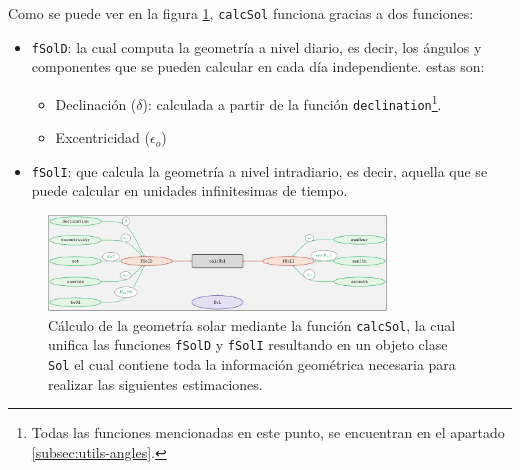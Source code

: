 Como se puede ver en la figura \ref{fig:calcSol}, \texttt{calcSol} funciona gracias a dos funciones:
\begin{itemize}
\item \texttt{fSolD}: la cual computa la geometría a nivel diario, es decir, los ángulos y componentes que se pueden calcular en cada día independiente.
estas son:
\begin{itemize}
\item Declinación (\(\delta\)): calculada a partir de la función \texttt{declination}\footnote{Todas las funciones mencionadas en este punto, se encuentran en el apartado \ref{subsec:utils-angles}.}.
\item Excentricidad (\(\epsilon_o\))
\end{itemize}
\item \texttt{fSolI}: que calcula la geometría a nivel intradiario, es decir, aquella que se puede calcular en unidades infinitesimas de tiempo.
\end{itemize}
\begin{figure}[]
\centering
\includegraphics[keepaspectratio,width=0.8\textwidth,height=0.5\textheight]{figuras/calcSol.pdf}
\caption{Cálculo de la geometría solar mediante la función \texttt{calcSol}, la cual unifica las funciones \texttt{fSolD} y \texttt{fSolI} resultando en un objeto clase \texttt{Sol} el cual contiene toda la información geométrica necesaria para realizar las siguientes estimaciones. \label{fig:calcSol}}
\end{figure}

